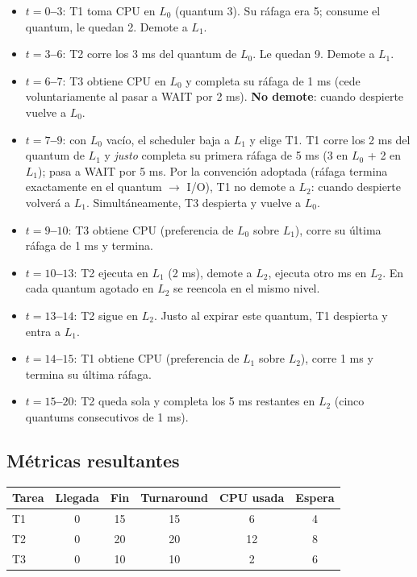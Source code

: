 \documentclass[11pt,a4paper]{article}
\begin{document}
\begin{itemize}[leftmargin=*,nosep]
    \item \textbf{$t = 0$--$3$}: T1 toma CPU en $L_0$ (quantum 3).
        Su ráfaga era 5; consume el quantum, le quedan 2. Demote
        a $L_1$.
    \item \textbf{$t = 3$--$6$}: T2 corre los 3 ms del quantum de
        $L_0$. Le quedan 9. Demote a $L_1$.
    \item \textbf{$t = 6$--$7$}: T3 obtiene CPU en $L_0$ y completa
        su ráfaga de 1 ms (cede voluntariamente al pasar a WAIT por 2
        ms). \textbf{No demote}: cuando despierte vuelve a $L_0$.
    \item \textbf{$t = 7$--$9$}: con $L_0$ vacío, el scheduler baja a
        $L_1$ y elige T1. T1 corre los 2 ms del quantum de $L_1$ y
        \emph{justo} completa su primera ráfaga de 5 ms (3 en $L_0$
        + 2 en $L_1$); pasa a WAIT por 5 ms. Por la convención
        adoptada (ráfaga termina exactamente en el quantum $\to$
        I/O), T1 no demote a $L_2$: cuando despierte volverá a $L_1$.
        Simultáneamente, T3 despierta y vuelve a $L_0$.
    \item \textbf{$t = 9$--$10$}: T3 obtiene CPU (preferencia de
        $L_0$ sobre $L_1$), corre su última ráfaga de 1 ms y termina.
    \item \textbf{$t = 10$--$13$}: T2 ejecuta en $L_1$ (2 ms), demote
        a $L_2$, ejecuta otro ms en $L_2$. En cada quantum agotado
        en $L_2$ se reencola en el mismo nivel.
    \item \textbf{$t = 13$--$14$}: T2 sigue en $L_2$. Justo al
        expirar este quantum, T1 despierta y entra a $L_1$.
    \item \textbf{$t = 14$--$15$}: T1 obtiene CPU (preferencia de
        $L_1$ sobre $L_2$), corre 1 ms y termina su última ráfaga.
    \item \textbf{$t = 15$--$20$}: T2 queda sola y completa los 5 ms
        restantes en $L_2$ (cinco quantums consecutivos de 1 ms).
\end{itemize}

\subsection*{Métricas resultantes}

\begin{center}
\small
\begin{tabular}{@{}lccccc@{}}
\toprule
Tarea & Llegada & Fin & Turnaround & CPU usada & Espera \\
\midrule
T1 & 0 & 15 & 15 & 6  & 4 \\
T2 & 0 & 20 & 20 & 12 & 8 \\
T3 & 0 & 10 & 10 & 2  & 6 \\
\bottomrule
\end{tabular}
\end{center}
\end{document}
